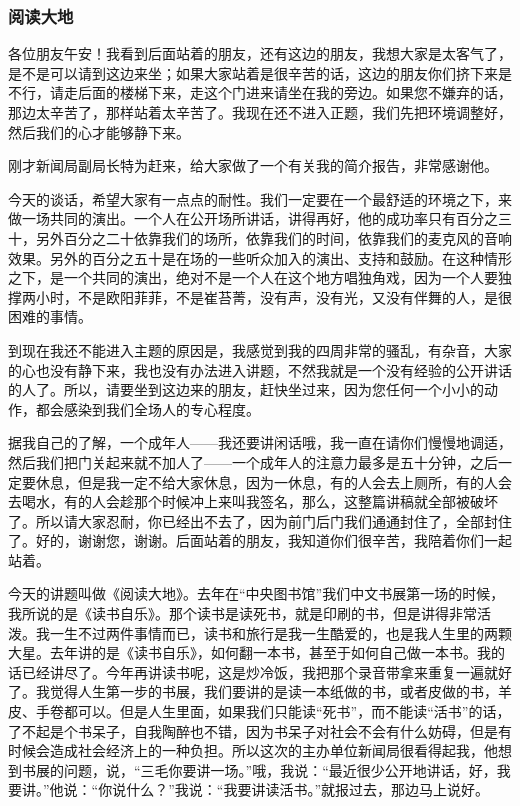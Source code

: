 \subsubsection{阅读大地}


\par 各位朋友午安！我看到后面站着的朋友，还有这边的朋友，我想大家是太客气了，是不是可以请到这边来坐；如果大家站着是很辛苦的话，这边的朋友你们挤下来是不行，请走后面的楼梯下来，走这个门进来请坐在我的旁边。如果您不嫌弃的话，那边太辛苦了，那样站着太辛苦了。我现在还不进入正题，我们先把环境调整好，然后我们的心才能够静下来。
\par 刚才新闻局副局长特为赶来，给大家做了一个有关我的简介报告，非常感谢他。
\par 今天的谈话，希望大家有一点点的耐性。我们一定要在一个最舒适的环境之下，来做一场共同的演出。一个人在公开场所讲话，讲得再好，他的成功率只有百分之三十，另外百分之二十依靠我们的场所，依靠我们的时间，依靠我们的麦克风的音响效果。另外的百分之五十是在场的一些听众加入的演出、支持和鼓励。在这种情形之下，是一个共同的演出，绝对不是一个人在这个地方唱独角戏，因为一个人要独撑两小时，不是欧阳菲菲，不是崔苔菁，没有声，没有光，又没有伴舞的人，是很困难的事情。
\par 到现在我还不能进入主题的原因是，我感觉到我的四周非常的骚乱，有杂音，大家的心也没有静下来，我也没有办法进入讲题，不然我就是一个没有经验的公开讲话的人了。所以，请要坐到这边来的朋友，赶快坐过来，因为您任何一个小小的动作，都会感染到我们全场人的专心程度。
\par 据我自己的了解，一个成年人——我还要讲闲话哦，我一直在请你们慢慢地调适，然后我们把门关起来就不加人了——一个成年人的注意力最多是五十分钟，之后一定要休息，但是我一定不给大家休息，因为一休息，有的人会去上厕所，有的人会去喝水，有的人会趁那个时候冲上来叫我签名，那么，这整篇讲稿就全部被破坏了。所以请大家忍耐，你已经出不去了，因为前门后门我们通通封住了，全部封住了。好的，谢谢您，谢谢。后面站着的朋友，我知道你们很辛苦，我陪着你们一起站着。
\par 今天的讲题叫做《阅读大地》。去年在“中央图书馆”我们中文书展第一场的时候，我所说的是《读书自乐》。那个读书是读死书，就是印刷的书，但是讲得非常活泼。我一生不过两件事情而已，读书和旅行是我一生酷爱的，也是我人生里的两颗大星。去年讲的是《读书自乐》，如何翻一本书，甚至于如何自己做一本书。我的话已经讲尽了。今年再讲读书呢，这是炒冷饭，我把那个录音带拿来重复一遍就好了。我觉得人生第一步的书展，我们要讲的是读一本纸做的书，或者皮做的书，羊皮、手卷都可以。但是人生里面，如果我们只能读“死书”，而不能读“活书”的话，了不起是个书呆子，自我陶醉也不错，因为书呆子对社会不会有什么妨碍，但是有时候会造成社会经济上的一种负担。所以这次的主办单位新闻局很看得起我，他想到书展的问题，说，“三毛你要讲一场。”哦，我说：“最近很少公开地讲话，好，我要讲。”他说：“你说什么？”我说：“我要讲读活书。”就报过去，那边马上说好。
